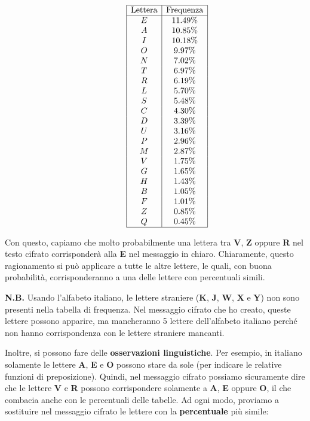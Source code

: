 \documentclass{rapport}
\begin{document}
\[\begin{array}{c@{\hskip 1cm}c}
\begin{array}{|c|c|}
\hline
\end{array}
&
\begin{array}{|c|c|}
\hline
\text{Lettera} & \text{Frequenza} \\ \hline
E & 11.49\%  \\ 
A & 10.85\%  \\ 
I & 10.18\%  \\ 
O & 9.97\%  \\ 
N & 7.02\%  \\ 
T & 6.97\%  \\ 
R & 6.19\%  \\ 
L & 5.70\%  \\ 
S & 5.48\%  \\ 
C & 4.30\%  \\ 
D & 3.39\%  \\ 
U & 3.16\%  \\ 
P & 2.96\%  \\ 
M & 2.87\%  \\ 
V & 1.75\%  \\ 
G & 1.65\%  \\ 
H & 1.43\%  \\ 
B & 1.05\%  \\ 
F & 1.01\%  \\ 
Z & 0.85\%  \\ 
Q & 0.45\%  \\  
\hline
\end{array}
\end{array}
\]


Con questo, capiamo che molto probabilmente una lettera tra \textbf{V}, \textbf{Z} oppure \textbf{R} nel testo cifrato corrisponderà alla \textbf{E} nel messaggio in chiaro.  
Chiaramente, questo ragionamento si può applicare a tutte le altre lettere, le quali, con buona probabilità, corrisponderanno a una delle lettere con percentuali simili.


\textbf{N.B.} Usando l'alfabeto italiano, le lettere straniere (\textbf{K}, \textbf{J}, \textbf{W}, \textbf{X} e \textbf{Y}) non sono presenti nella tabella di frequenza.  
Nel messaggio cifrato che ho creato, queste lettere possono apparire, ma mancheranno 5 lettere dell'alfabeto italiano perché non hanno corrispondenza con le lettere straniere mancanti.


\newpage
Inoltre, si possono fare delle \textbf{osservazioni linguistiche}.  
Per esempio, in italiano solamente le lettere \textbf{A}, \textbf{E} e \textbf{O} possono stare da sole (per indicare le relative funzioni di preposizione).  
Quindi, nel messaggio cifrato possiamo sicuramente dire che le lettere \textbf{V} e \textbf{R} possono corrispondere solamente a \textbf{A}, \textbf{E} oppure \textbf{O}, il che combacia anche con le percentuali delle tabelle.  
Ad ogni modo, proviamo a sostituire nel messaggio cifrato le lettere con la \textbf{percentuale} più simile:
\end{document}
